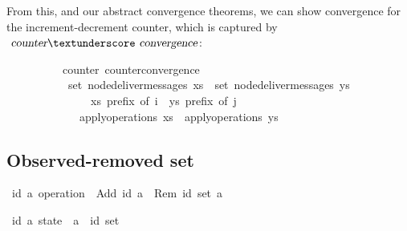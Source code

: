 \vspace{0.375em}
From this, and our abstract convergence theorems, we can show convergence for the increment-decrement counter, which is captured by $\isa{counter}{\isacharunderscore}\isa{convergence}$:
\vspace{0.375em}
\begin{isabellebody}
\ \ \ \ \ \ \ \ \ {\isacharparenleft}\ counter{\isacharparenright}\ counter{\isacharunderscore}convergence{\isacharcolon}\isanewline
\ \ \ \ \ \ \ \ \ \ \ {\isachardoublequoteopen}set\ {\isacharparenleft}node{\isacharunderscore}deliver{\isacharunderscore}messages\ xs{\isacharparenright}\ {\isacharequal}\ set\ {\isacharparenleft}node{\isacharunderscore}deliver{\isacharunderscore}messages\ ys{\isacharparenright}{\isachardoublequoteclose}\isanewline
\ \ \ \ \ \ \ \ \ \ \ \ \ \ \ {\isachardoublequoteopen}xs\ prefix\ of\ i{\isachardoublequoteclose}\ \ {\isachardoublequoteopen}ys\ prefix\ of\ j{\isachardoublequoteclose}\isanewline
\ \ \ \ \ \ \ \ \ \ \ \ \ {\isachardoublequoteopen}apply{\isacharunderscore}operations\ xs\ {\isacharequal}\ apply{\isacharunderscore}operations\ ys{\isachardoublequoteclose}
\end{isabellebody}

\subsection{Observed-removed set}
\label{subsect.observed-removed.set}

\begin{isabellebody}
\isamarkupfalse%
\ {\isacharparenleft}{\isacharprime}id{\isacharcomma}\ {\isacharprime}a{\isacharparenright}\ operation\ {\isacharequal}\ Add\ {\isachardoublequoteopen}{\isacharprime}id{\isachardoublequoteclose}\ {\isachardoublequoteopen}{\isacharprime}a{\isachardoublequoteclose}\ {\isacharbar}\ Rem\ {\isachardoublequoteopen}{\isacharprime}id\ set{\isachardoublequoteclose}\ {\isachardoublequoteopen}{\isacharprime}a{\isachardoublequoteclose}\isanewline
\end{isabellebody}

\begin{isabellebody}
\isamarkupfalse%
\ {\isacharparenleft}{\isacharprime}id{\isacharcomma}\ {\isacharprime}a{\isacharparenright}\ state\ {\isacharequal}\ {\isachardoublequoteopen}{\isacharprime}a\ {\isasymRightarrow}\ {\isacharprime}id\ set{\isachardoublequoteclose}\isanewline
\end{isabellebody}

